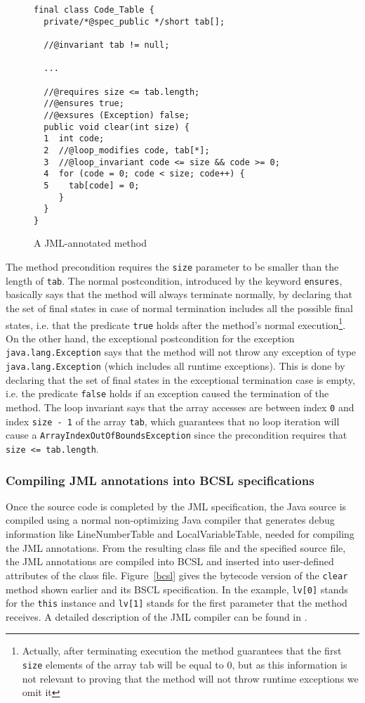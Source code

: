 \begin{figure}
\begin{verbatim}
final class Code_Table {
  private/*@spec_public */short tab[];

  //@invariant tab != null;

  ...

  //@requires size <= tab.length;
  //@ensures true;
  //@exsures (Exception) false;
  public void clear(int size) {
  1  int code;
  2  //@loop_modifies code, tab[*];
  3  //@loop_invariant code <= size && code >= 0;
  4  for (code = 0; code < size; code++) {
  5    tab[code] = 0;
     }
  }
}
\end{verbatim}

\caption{A JML-annotated method}
\label{fig:jmlexample}
\end{figure}

The method precondition requires the \verb!size! parameter to be smaller than the length of \verb!tab!. The normal postcondition, introduced by the keyword \verb!ensures!, basically says that the method will always terminate normally, by declaring that the set of final states in case of normal termination includes all the possible final states, i.e. that the predicate \verb!true! holds after the method's normal execution\footnote{Actually, after terminating execution the method guarantees that the first \texttt{size} elements of the array tab will be equal to 0, but as this information is not relevant to proving that the method will not throw runtime exceptions we omit it}. On the other hand, the exceptional postcondition for the exception \texttt{java.lang.Exception} says that the method will not throw any exception of type \texttt{java.lang.Exception} (which includes all runtime exceptions). This is done by declaring that the set of final states in the exceptional termination case is empty, i.e. the predicate \texttt{false} holds if an exception caused the termination of the method. The loop invariant says that the array accesses are between index \verb!0! and index \verb!size - 1! of the array \verb!tab!, which guarantees that no loop iteration will cause a \verb!ArrayIndexOutOfBoundsException! since the precondition requires that \verb!size <= tab.length!.

\subsubsection{Compiling JML annotations into BCSL specifications}
\label{JML2BCSL}
Once the source code is completed by the JML specification, the Java source is compiled using a normal non-optimizing Java compiler that generates debug information like \textrm{LineNumberTable} and \textrm{LocalVariableTable}, needed for compiling the JML annotations. From the resulting class file and the specified source file, the JML annotations are compiled into BCSL and inserted into user-defined attributes of the class file. Figure~\ref{bcsl} gives the bytecode version of the \verb!clear! method shown earlier and its BSCL specification. In the example, \verb!lv[0]! stands for the \verb!this! instance and \verb!lv[1]! stands for the first parameter that the method receives. A detailed description of the JML compiler can be found in \cite{JBL05MP}.

